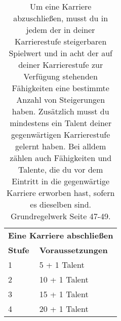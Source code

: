 \documentclass[a4paper, fontsize=11pt]{scrartcl}
\begin{document}
\begin{table}[!ht]
    \centering
    \begin{tabularx}{\textwidth}{l|X}
        \multicolumn{2}{c}{\cellcolor{gray!25} \textbf{Eine Karriere abschließen}                                                 } \\ \cline{1-2}
        \textbf{Stufe} & \textbf{Voraussetzungen}                                                                                   \\ \cline{1-2}
        1              & 5 + 1 Talent                                                                                               \\ \cline{1-2}
        2              & 10 + 1 Talent                                                                                              \\ \cline{1-2}
        3              & 15 + 1 Talent                                                                                              \\ \cline{1-2}
        4              & 20 + 1 Talent
    \end{tabularx}
    \caption{Um eine Karriere abzuschließen, musst du in jedem der in deiner Karrierestufe steigerbaren Spielwert und in acht der auf deiner Karrierestufe zur Verfügung stehenden Fähigkeiten eine bestimmte Anzahl von Steigerungen haben. Zusätzlich musst du mindestens ein
        Talent deiner gegenwärtigen Karrierestufe gelernt haben. Bei alldem zählen auch Fähigkeiten und Talente, die du vor dem Eintritt in die gegenwärtige Karriere erworben hast, sofern es dieselben sind.
        Grundregelwerk Seite 47-49.
    }
\end{table}
\end{document}
